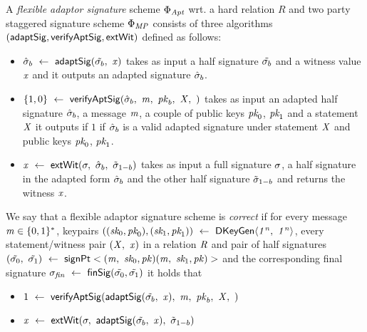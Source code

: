 \begin{definition}
A \emph{flexible adaptor signature} scheme $\Phi_{\mathit{Apt}}$ wrt. a hard relation $R$ and two party staggered signature scheme $\Phi_{\mathit{MP}}$ consists of three algorithms $(\mathsf{adaptSig}, \mathsf{verifyAptSig}, \mathsf{extWit})$ defined as follows:


\begin{itemize}
        \item $\hat{\sigma}_b ~\leftarrow~ \mathsf{adaptSig}(\tilde{\sigma_b} ,~ \mathit{x})$ takes as input a half signature $\tilde{\sigma_b}$ and a witness value $\mathit{x}$ and it outputs an adapted signature $\hat{\sigma}_b$. 
        \item $\{1,0\} ~\leftarrow~ \mathsf{verifyAptSig}(\hat{\sigma}_b ,~ \mathit{m} ,~ \mathit{pk}_b ,~ \mathit{X} ,~ )$ takes as input an adapted half signature $\hat{\sigma}_b$, a message $\mathit{m}$, a couple of public keys $\textit{pk}_0$, $\textit{pk}_1$ and a statement $\mathit{X}$ it outputs if $1$ if $\hat{\sigma}_b$ is a valid adapted signature under statement $\mathit{X}$ and public keys $\textit{pk}_0$, $\textit{pk}_1$. 
        \item $\mathit{x} ~\leftarrow~ \mathsf{extWit}(\sigma ,~ \hat{\sigma}_b ,~ \tilde{\sigma}_{1-b})$ takes as input a full signature $\sigma$, a half signature in the adapted form $\hat{\sigma}_b$ and the other half signature $\tilde{\sigma}_{1-b}$ and returns the witness $\mathit{x}$.
    \end{itemize}

\end{definition}




\begin{definition}
We say that a flexible adaptor signature scheme is \emph{correct} if for every message $\mathit{m} \in \{0,1\}^{*}$, keypairs $((\textit{sk}_0, \textit{pk}_0), (\textit{sk}_1, \textit{pk}_1)) ~\leftarrow~ \mathsf{DKeyGen}\langle \mathit{1^n} ,~ \mathit{1^n} \rangle$, every statement/witness pair $(\mathit{X} ,~ \mathit{x})$ in a relation $\mathit{R}$ and pair of half signatures $(\tilde{\sigma_0} ,~ \tilde{\sigma_1}) ~\leftarrow~ \mathsf{signPt}<(\mathit{m} ,~ \textit{sk}_0, \mathit{pk})(\mathit{m} ,~ \textit{sk}_1, \mathit{pk})>$ and the corresponding final signature $\sigma_{\mathit{fin}} ~\leftarrow~ \mathsf{finSig}(\tilde{\sigma_0},\tilde{\sigma_1})$ it holds that 
	
	\begin{itemize}
		\item $1 ~\leftarrow~ \mathsf{verifyAptSig}(\mathsf{adaptSig}(\tilde{\sigma_b} ,~ \mathit{x}) ,~ \mathit{m} ,~ \mathit{pk}_b ,~ \mathit{X} ,~ )$
		\item $\mathit{x} ~\leftarrow~ \mathsf{extWit}(\sigma ,~ \mathsf{adaptSig}(\tilde{\sigma_b} ,~ \mathit{x}) ,~ \tilde{\sigma}_{1-b})$
	\end{itemize}

\end{definition}


